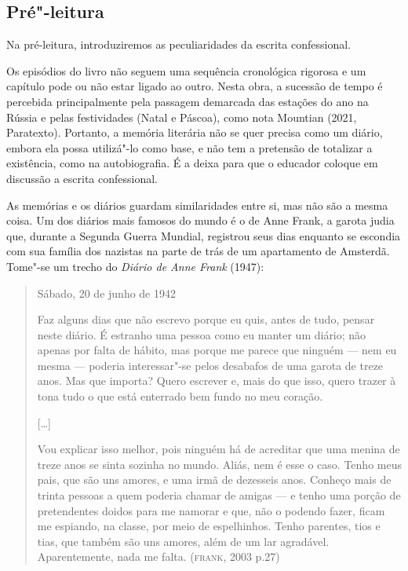 \documentclass[11pt]{extarticle}
\begin{document}
\subsection{Pré"-leitura}

Na pré-leitura, introduziremos as peculiaridades da escrita confessional.

Os episódios do livro não seguem uma sequência cronológica rigorosa e
um capítulo pode ou não estar ligado ao outro. Nesta obra, a sucessão de
tempo é percebida principalmente pela passagem demarcada das estações do
ano na Rússia e pelas festividades (Natal e Páscoa), como nota Mountian
(2021, Paratexto). Portanto, a memória literária não se quer precisa
como um diário, embora ela possa utilizá"-lo como base, e não tem a
pretensão de totalizar a existência, como na autobiografia. É a deixa
para que o educador coloque em discussão a escrita confessional.

As memórias e os diários guardam similaridades entre si, mas não são a
mesma coisa. Um dos diários mais famosos do mundo é o de Anne Frank, a
garota judia que, durante a Segunda Guerra Mundial, registrou seus dias
enquanto se escondia com sua família dos nazistas na parte de trás de um
apartamento de Amsterdã. Tome"-se um trecho do \emph{Diário de Anne
Frank} (1947):

\begin{quote}
Sábado, 20 de junho de 1942

Faz alguns dias que não escrevo porque eu quis, antes de tudo, pensar
neste diário. É estranho uma pessoa como eu manter um diário; não apenas
por falta de hábito, mas porque me parece que ninguém --- nem eu mesma
--- poderia interessar"-se pelos desabafos de uma garota de treze anos.
Mas que importa? Quero escrever e, mais do que isso, quero trazer à tona
tudo o que está enterrado bem fundo no meu coração.

{[}\ldots{}{]}

Vou explicar isso melhor, pois ninguém há de acreditar que uma menina de
treze anos se sinta sozinha no mundo. Aliás, nem é esse o caso. Tenho
meus pais, que são uns amores, e uma irmã de dezesseis anos. Conheço
mais de trinta pessoas a quem poderia chamar de amigas --- e tenho uma
porção de pretendentes doidos para me namorar e que, não o podendo
fazer, ficam me espiando, na classe, por meio de espelhinhos. Tenho
parentes, tios e tias, que também são uns amores, além de um lar
agradável. Aparentemente, nada me falta. (\textsc{frank}, 2003 p.27)
\end{quote}
\end{document}
